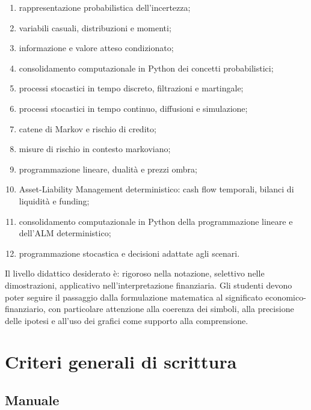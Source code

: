 \documentclass[12pt,a4paper]{article}%
\newcommand{\1}{\mathbf{1}}
\begin{document}
\begin{enumerate}
\item rappresentazione probabilistica dell'incertezza;

\item variabili casuali, distribuzioni e momenti;

\item informazione e valore atteso condizionato;

\item consolidamento computazionale in Python dei concetti probabilistici;

\item processi stocastici in tempo discreto, filtrazioni e martingale;

\item processi stocastici in tempo continuo, diffusioni e simulazione;

\item catene di Markov e rischio di credito;

\item misure di rischio in contesto markoviano;

\item programmazione lineare, dualit\`a e prezzi ombra;

\item Asset-Liability Management deterministico: cash flow temporali,
bilanci di liquidit\`a e funding;

\item consolidamento computazionale in Python della programmazione lineare
e dell'ALM deterministico;

\item programmazione stocastica e decisioni adattate agli scenari.
\end{enumerate}

Il livello didattico desiderato \`{e}: rigoroso nella notazione, selettivo
nelle dimostrazioni, applicativo nell'interpretazione finanziaria. Gli
studenti devono poter seguire il passaggio dalla formulazione matematica al
significato economico-finanziario, con particolare attenzione alla coerenza
dei simboli, alla precisione delle ipotesi e all'uso dei grafici come supporto
alla comprensione.

\section{Criteri generali di scrittura}

\subsection{Manuale}
\end{document}
